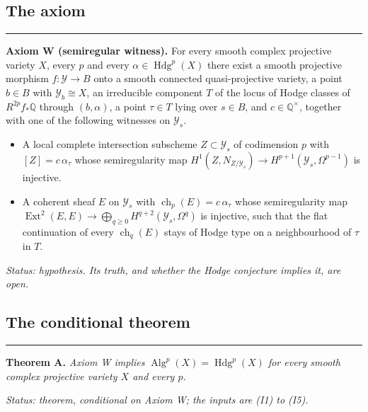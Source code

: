 \documentclass[10pt,twocolumn]{article}
\newenvironment{jbox}{\par\vspace{2pt}\noindent\color{accent}\rule{\columnwidth}{0.8pt}\par\vspace{-2pt}\small}{\par\vspace{2pt}}
\begin{document}
\hypertarget{the-axiom}{%
\subsection{The axiom}\label{the-axiom}}

\begin{jbox}
\color{black}
\textbf{Axiom W (semiregular witness).} For every smooth complex projective variety $X$, every $p$ and every $\alpha\in\operatorname{Hdg}^p(X)$ there exist a smooth projective morphism $f\colon\mathcal{Y}\to B$ onto a smooth connected quasi-projective variety, a point $b\in B$ with $\mathcal{Y}_b\cong X$, an irreducible component $T$ of the locus of Hodge classes of $R^{2p}f_*\mathbb{Q}$ through $(b,\alpha)$, a point $\tau\in T$ lying over $s\in B$, and $c\in\mathbb{Q}^\times$, together with one of the following witnesses on $\mathcal{Y}_s$.
\begin{itemize}[leftmargin=2.2em,itemsep=1pt,topsep=2pt]
\item[(W1)] A local complete intersection subscheme $Z\subset\mathcal{Y}_s$ of codimension $p$ with $[Z]=c\,\alpha_\tau$ whose semiregularity map $H^1(Z,N_{Z/\mathcal{Y}_s})\to H^{p+1}(\mathcal{Y}_s,\Omega^{p-1})$ is injective.
\item[(W2)] A coherent sheaf $E$ on $\mathcal{Y}_s$ with $\operatorname{ch}_p(E)=c\,\alpha_\tau$ whose semiregularity map $\operatorname{Ext}^2(E,E)\to\bigoplus_{q\ge0}H^{q+2}(\mathcal{Y}_s,\Omega^q)$ is injective, such that the flat continuation of every $\operatorname{ch}_q(E)$ stays of Hodge type on a neighbourhood of $\tau$ in $T$.
\end{itemize}
\textit{Status: hypothesis. Its truth, and whether the Hodge conjecture implies it, are open.}
\end{jbox}

\hypertarget{the-conditional-theorem}{%
\subsection{The conditional theorem}\label{the-conditional-theorem}}

\begin{jbox}
\color{black}
\textbf{Theorem A.} \textit{Axiom W implies $\operatorname{Alg}^p(X)=\operatorname{Hdg}^p(X)$ for every smooth complex projective variety $X$ and every $p$.}\par\smallskip
\textit{Status: theorem, conditional on Axiom W; the inputs are (I1) to (I5).}
\end{jbox}
\end{document}
